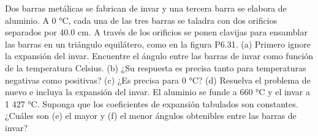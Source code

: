 \item Dos barras metálicas se fabrican de invar y una tercera barra se elabora de aluminio. A 0 °C, cada una de las tres barras se taladra con dos orificios separados por 40.0 cm. A través de los orificios se ponen clavijas para ensamblar las barras en un triángulo equilátero, como en la figura P6.31. 
(a) Primero ignore la expansión del invar. Encuentre el ángulo entre las barras de invar como función de la temperatura Celsius. 
(b) ¿Su respuesta es precisa tanto para temperaturas negativas como positivas? 
(c) ¿Es precisa para 0 °C? 
(d) Resuelva el problema de nuevo e incluya la expansión del invar. El aluminio se funde a 660 °C y el invar a 1 427 °C. Suponga que los coeficientes de expansión tabulados son constantes. ¿Cuáles son (e) el mayor y (f) el menor ángulos obtenibles entre las barras de invar?

